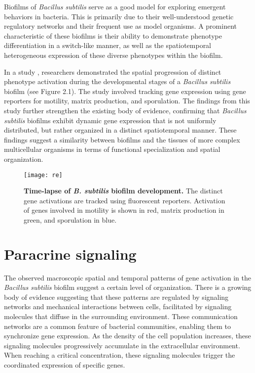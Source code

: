 Biofilms of \textit{Bacillus subtilis} serve as a good model for exploring emergent behaviors in bacteria. This is primarily due to their well-understood genetic regulatory networks and their frequent use as model organisms. A prominent characteristic of these biofilms is their ability to demonstrate phenotype differentiation in a switch-like manner, as well as the spatiotemporal heterogeneous expression of these diverse phenotypes within the biofilm. {\footnotesize\cite{Lpez2009}\cite{Srinivasan2018}\cite{Vlamakis2013}}

In a study {\footnotesize\cite{Srinivasan2018}}, researchers demonstrated the spatial progression of distinct phenotype activation during the developmental stages of a \textit{Bacillus subtilis} biofilm (see Figure 2.1). The study involved tracking gene expression using gene reporters for motility, matrix production, and sporulation. The findings from this study further strengthen the existing body of evidence, confirming that \textit{Bacillus subtilis} biofilms exhibit dynamic gene expression that is not uniformly distributed, but rather organized in a distinct spatiotemporal manner. These findings suggest a similarity between biofilms and the tissues of more complex multicellular organisms in terms of functional specialization and spatial organization.

\begin{figure}[h]
    \centering
    \texttt{[image: re]}
    \caption{\footnotesize \textbf{Time-lapse of \textit{B. subtilis} biofilm development.} The distinct gene activations are tracked using fluorescent reporters. Activation of genes involved in motility is shown in red, matrix production in green, and sporulation in blue.{\footnotesize\cite{Srinivasan2018}}}


\end{figure}



\section{Paracrine signaling}\label{sec:litrev:theme2}

The observed macroscopic spatial and temporal patterns of gene activation in the \textit{Bacillus subtilis} biofilm suggest a certain level of organization. There is a growing body of evidence suggesting that these patterns are regulated by signaling networks and mechanical interactions between cells, facilitated by signaling molecules that diffuse in the surrounding environment. These communication networks are a common feature of bacterial communities, enabling them to synchronize gene expression. As the density of the cell population increases, these signaling molecules progressively accumulate in the extracellular environment. When reaching a critical concentration, these signaling molecules trigger the coordinated expression of specific genes.{\footnotesize\cite{Arnaouteli2021}}

